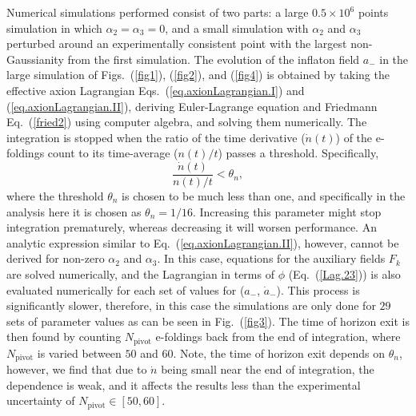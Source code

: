 \documentclass[a4paper,11pt]{article}
\begin{document}
Numerical simulations performed consist of two parts: a large $0.5 \times 10^6$ points simulation in which $\alpha_2 = \alpha_3 = 0$, and a small simulation with $\alpha_2$ and $\alpha_3$ perturbed around an experimentally consistent point with the largest non-Gaussianity from the first simulation.
  The evolution of the inflaton field $a_-$ in the large simulation of Figs.~(\ref{fig1}), (\ref{fig2}), and (\ref{fig4}) is obtained by taking the effective axion Lagrangian Eqs.~(\ref{eq.axionLagrangian.I}) and (\ref{eq.axionLagrangian.II}), deriving Euler-Lagrange equation and Friedmann Eq.~(\ref{fried2}) using computer algebra, and solving them numerically. The integration is stopped when the ratio of the time derivative ($\dot n\left(t\right)$) of the e-foldings count to its time-average ($n\left(t\right) / t$) passes a threshold. Specifically,
  \begin{equation} 
  	\frac{\dot n \left(t\right)}{n\left(t\right) / t} < \theta_n,
  \end{equation} 
  where the threshold $\theta_n$ is chosen to be much less than one, and specifically
   in the analysis here it is chosen as $\theta_n = 1 / 16$. Increasing this parameter might stop integration prematurely, whereas decreasing it will worsen performance.
  An analytic expression similar to Eq.~(\ref{eq.axionLagrangian.II}), however,  cannot be derived  for  non-zero $\alpha_2$ and $\alpha_3$. In this case,  equations for the auxiliary fields $F_k$ are  solved numerically,  and the Lagrangian in terms of $\phi$ (Eq.~(\ref{Lag.23})) is
  also evaluated numerically for each set of values for ($a_-$, $\dot a_-$).  
   This process is significantly slower, therefore, in this case the simulations are only done for $29$ sets of parameter values as can be seen in Fig.~(\ref{fig3}). 
    The time of horizon exit is then found by counting $N_\text{pivot}$ e-foldings back from the end of integration, where $N_\text{pivot}$ is varied between $50$ and $60$. Note, the time of horizon exit depends on $\theta_n$, however, we find that due to $\dot n$ being small near the end of integration, the dependence is weak, and it affects the results less than the experimental uncertainty of $N_\text{pivot} \in \left[50, 60\right]$.{}
\end{document}
